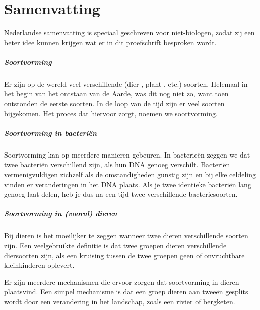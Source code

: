 \chapter*{Samenvatting}

{

\noindent 
{} Nederlandse samenvatting is speciaal geschreven
voor niet-biologen, zodat zij een beter idee kunnen
krijgen wat er in dit proefschrift besproken wordt.

\paragraph{Soortvorming}

Er zijn op de wereld veel verschillende (dier-, plant-, etc.) soorten.
Helemaal in het begin van het ontstaan van de Aarde, 
was dit nog niet zo, want toen ontstonden de eerste soorten.
In de loop van de tijd zijn er veel soorten bijgekomen.
Het proces dat hiervoor zorgt, noemen we soortvorming.

\paragraph{Soortvorming in bacteriën}

Soortvorming kan op meerdere manieren gebeuren.
In bacterieën zeggen we dat twee bacteriën verschillend zijn,
als hun DNA genoeg verschilt. Bacteriën vermenigvuldigen zichzelf
als de omstandigheden gunstig zijn en bij elke celdeling vinden
er veranderingen in het DNA plaats. Als je twee identieke bacteriën
lang genoeg laat delen, heb je dus na een tijd twee verschillende 
bacteriesoorten.

\paragraph{Soortvorming in (vooral) dieren}

Bij dieren is het moeilijker te zeggen wanneer twee dieren
verschillende soorten zijn. Een veelgebruikte definitie is dat
twee groepen dieren verschillende diersoorten zijn, als een kruising
tussen de twee groepen geen of onvruchtbare kleinkinderen oplevert.

Er zijn meerdere mechanismen die ervoor zorgen 
dat soortvorming in dieren plaatsvind. 
Een simpel mechanisme is dat een groep dieren aan tweeën gesplits
wordt door een verandering in het landschap, 
zoals een rivier of bergketen.

}
